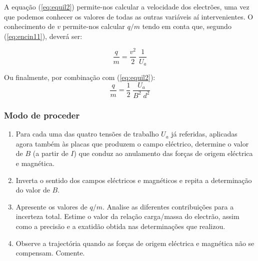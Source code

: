 \documentclass[a4paper,twoside,11pt]{report}      %
\begin{document}
A equação (\ref{eq:equil2}) permite-nos calcular a velocidade dos electrões, uma vez que podemos conhecer os valores de todas as outras variáveis aí intervenientes. O conhecimento de $v$ permite-nos calcular $q/m$ tendo em conta que, segundo (\ref{eq:encin11}), deverá ser:

\begin{equation*}
\label{eq:encin1}
\frac{q}{m} = \frac{v^2}{2} \; \frac{1}{U_a}
\end{equation*}

Ou finalmente, por combinação com (\ref{eq:equil2}):
\begin{equation}
	\label{eq:qmquase}
\frac{q}{m} = \frac{1}{2} \; \frac{U_a}{B^2\; d^2} 
\end{equation}

\subsubsection{\sf Modo de proceder}
\begin{enumerate}
	\item Para cada uma das quatro tensões de trabalho $U_a$ já referidas, aplicadas agora também às placas que produzem o campo eléctrico, determine o valor de $B$ (a partir de $I$) que conduz ao anulamento das forças de origem eléctrica e magnética.
	\item Inverta o sentido dos campos eléctricos e magnéticos e repita a determinação do valor de $B$.
	\item Apresente os valores de $q/m$. Analise as diferentes contribuições para a incerteza total. Estime o valor da relação carga/massa do electrão, assim como a precisão e a exatidão obtida nas determinações que realizou.
	\item  Observe  a  trajectória  quando  as  forças  de 
origem eléctrica e magnética não se compensam. Comente. 
\end{enumerate}

\end{document}
